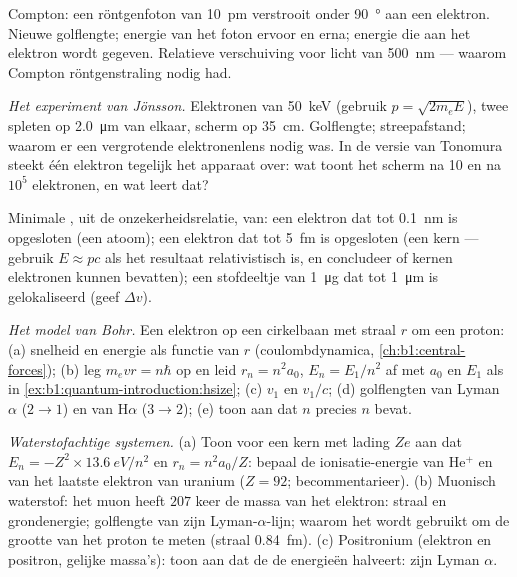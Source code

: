 \begin{exercise}[$\star\star$]\label{exo:b1:quantum-introduction:6}
Compton: een röntgenfoton van \qty{10}{pm} verstrooit onder \qty{90}{\degree} aan een
elektron. Nieuwe golflengte; energie van het foton ervoor en erna; energie
die aan het elektron wordt gegeven. Relatieve verschuiving voor licht van \qty{500}{nm} --- waarom
Compton röntgenstraling nodig had.
\end{exercise}

\begin{exercise}[$\star\star$]\label{exo:b1:quantum-introduction:7}
\emph{Het experiment van Jönsson.} Elektronen van \qty{50}{keV} (gebruik $p =
\sqrt{2m_eE}$), twee spleten op \qty{2.0}{\micro m} van elkaar, scherm op
\qty{35}{cm}. Golflengte; streepafstand; waarom er een vergrotende elektronenlens
nodig was. In de versie van Tonomura steekt één elektron tegelijk het
apparaat over: wat toont het scherm na 10 en na $10^5$ elektronen,
en wat leert dat?
\end{exercise}

\begin{exercise}[$\star\star$]\label{exo:b1:quantum-introduction:8}
Minimale , uit de onzekerheidsrelatie, van: een
elektron dat tot \qty{0.1}{nm} is opgesloten (een atoom); een elektron dat tot
\qty{5}{fm} is opgesloten (een kern --- gebruik $E \approx pc$ als het resultaat
relativistisch is, en concludeer of kernen elektronen kunnen bevatten); een
stofdeeltje van \qty{1}{\micro g} dat tot \qty{1}{\micro m} is gelokaliseerd (geef $\Delta v$).
\end{exercise}

\begin{exercise}[$\star\star$]\label{exo:b1:quantum-introduction:9}
\emph{Het model van Bohr.} Een elektron op een cirkelbaan met straal $r$ om een
proton: (a) snelheid en energie als functie van $r$ (coulombdynamica,
\cref{ch:b1:central-forces}); (b) leg $m_evr = n\hbar$ op en leid
$r_n = n^2a_0$, $E_n = E_1/n^2$ af met $a_0$ en $E_1$ als in
\cref{ex:b1:quantum-introduction:hsize}; (c) $v_1$ en $v_1/c$; (d)
golflengten van Lyman $\alpha$ ($2 \to 1$) en van H$\alpha$ ($3 \to 2$);
(e) toon aan dat  $n$ precies $n$  bevat.
\end{exercise}

\begin{exercise}[$\star\star\star$]\label{exo:b1:quantum-introduction:10}
\emph{Waterstofachtige systemen.} (a) Toon voor een kern met lading $Ze$ aan dat
$E_n = -Z^2 \times \qty{13.6}{eV}/n^2$ en $r_n = n^2a_0/Z$: bepaal de
ionisatie-energie van He$^+$ en van het laatste elektron van uranium ($Z = 92$; becommentarieer).
(b) Muonisch waterstof: het muon heeft $207$ keer de massa van het elektron:
straal en grondenergie; golflengte van zijn Lyman-$\alpha$-lijn; waarom het
wordt gebruikt om de grootte van het proton te meten (straal \qty{0.84}{fm}).
(c) Positronium (elektron en positron, gelijke massa's): toon aan dat de
 de energieën halveert: zijn Lyman $\alpha$.
\end{exercise}

